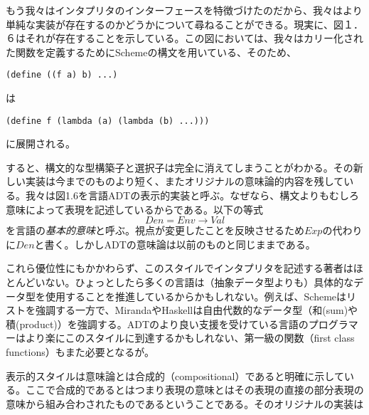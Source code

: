 \documentclass[11pt, oneside]{jsbook}   	%
\begin{document}
もう我々はインタプリタのインターフェースを特徴づけたのだから、我々はより単純な実装が存在するのかどうかについて尋ねることができる。現実に、図１．６はそれが存在することを示している。この図においては、我々はカリー化された関数を定義するためにSchemeの構文を用いている、そのため、
\begin{lstlisting}
(define ((f a) b) ...)
\end{lstlisting}
は
\newpage


\newpage


\begin{lstlisting}
(define f (lambda (a) (lambda (b) ...)))
\end{lstlisting}
に展開される。

すると、構文的な型構築子と選択子は完全に消えてしまうことがわかる。その新しい実装は今までのものより短く、またオリジナルの意味論的内容を残している。我々は図1.6を言語ADTの表示的実装と呼ぶ。なぜなら、構文よりもむしろ意味によって表現を記述しているからである。以下の等式
$$
Den = Env \rightarrow Val
$$
を言語の{\it 基本的意味}と呼ぶ。視点が変更したことを反映させるため$Exp$の代わりに$Den$と書く。しかしADTの意味論は以前のものと同じままである。

これら優位性にもかかわらず、このスタイルでインタプリタを記述する著者はほとんどいない。ひょっとしたら多くの言語は（抽象データ型よりも）具体的なデータ型を使用することを推進しているからかもしれない。例えば、Schemeはリストを強調する一方で、MirandaやHaskellは自由代数的なデータ型（和(sum)や積(product)）を強調する。ADTのより良い支援を受けている言語のプログラマーはより楽にこのスタイルに到達するかもしれない、第一級の関数（first class functions）もまた必要となるが。

表示的スタイルは意味論とは合成的（compositional）であると明確に示している。ここで合成的であるとはつまり表現の意味とはその表現の直接の部分表現の意味から組み合わされたものであるということである。そのオリジナルの実装は
\newpage

\newpage


\end{document}
